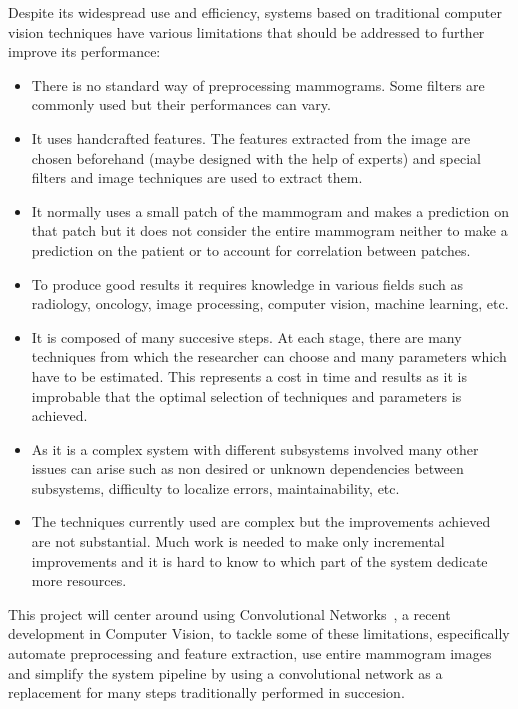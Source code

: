 Despite its widespread use and efficiency, systems based on traditional computer vision techniques have various limitations that should be addressed to further improve its performance:
\begin{itemize}
	\item There is no standard way of preprocessing mammograms. Some filters are commonly used but their performances can vary.
	\item It uses handcrafted features. The features extracted from the image are chosen beforehand (maybe designed with the help of experts) and special filters and image techniques are used to extract them.
	\item It normally uses a small patch of the mammogram and makes a prediction on that patch but it does not consider the entire mammogram neither to make a prediction on the patient or to account for correlation between patches.
	\item To produce good results it requires knowledge in various fields such as radiology, oncology, image processing, computer vision, machine learning, etc.
	\item It is composed of many succesive steps. At each stage, there are many techniques from which the researcher can choose and many parameters which have to be estimated. This represents a cost in time and results as it is improbable that the optimal selection of techniques and parameters is achieved.
	\item As it is a complex system with different subsystems involved many other issues can arise such as non desired or unknown dependencies between subsystems, difficulty to localize errors, maintainability, etc.  
	\item The techniques currently used are complex but the improvements achieved are not substantial. Much work is needed to make only incremental improvements and it is hard to know to which part of the system dedicate more resources.
\end{itemize}

This project will center around using Convolutional Networks~\cite{subsec:convnets}, a recent development in Computer Vision, to tackle some of these limitations, especifically automate preprocessing and feature extraction, use entire mammogram images and simplify the system pipeline by using a convolutional network as a replacement for many steps traditionally performed in succesion.

